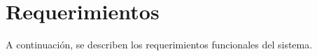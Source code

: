 \chapter{Requerimientos}
A continuación, se describen los requerimientos funcionales del sistema.\\

	
